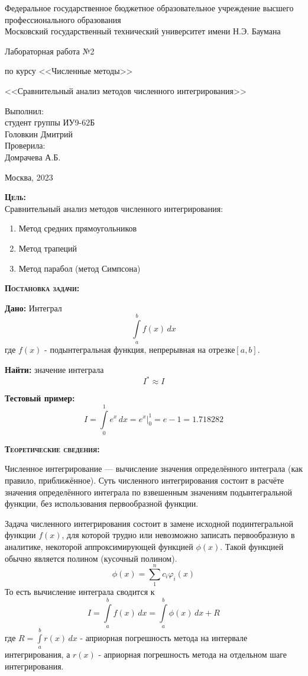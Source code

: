 \documentclass [12pt]{article}
\title{}
\date{}
\author{}
\begin{document}
\begin{titlepage}
\thispagestyle{empty}
\begin{center}
Федеральное государственное бюджетное образовательное учреждение высшего профессионального образования \\Московский государственный технический университет имени Н.Э. Баумана

\end{center}
\vfill
\centerline{\large{Лабораторная работа №2}}
\centerline{\large{по курсу <<Численные методы>>}}
\centerline{\large{<<Сравнительный анализ методов численного интегрирования>>}}
\vfill
\hfill\parbox{5cm} {
           Выполнил:\\
           студент группы ИУ9-62Б \hfill \\
           Головкин Дмитрий\hfill \medskip\\
           Проверила:\\
           Домрачева А.Б.\hfill
       }
\centerline{Москва, 2023}
\clearpage
\end{titlepage}
\textsc{\textbf{Цель:}} 
\\ Сравнительный анализ методов численного интегрирования:
\begin{enumerate}
\item Метод средних прямоугольников
\item Метод трапеций
\item Метод парабол (метод Симпсона)
\end{enumerate}

\textsc{\textbf{Постановка задачи:}}

\textbf{Дано:}  Интеграл $$\int\limits_a^b f(x)\,dx $$где $f(x)$ - подынтегральная функция, непрерывная на отрезке$[a,b]$.

\textbf{Найти:} значение интеграла $$I^{*} \approx  I $$

\textbf{Тестовый пример:} $$ I = \int\limits_0^1 e^x\,dx = e^x \bigg|_0^1 = e - 1 = 1.718282$$

\textsc{\textbf{Теоретические сведения:}}

Численное интегрирование — вычисление значения определённого интеграла (как правило, приближённое). Суть численного интегрирования состоит в расчёте значения определённого интеграла по взвешенным значениям подынтегральной функции, без использования первообразной функции.

Задача численного интегрирования состоит в замене исходной подинтегральной функции $f(x)$, для которой трудно или невозможно записать первообразную в аналитике, некоторой аппроксимирующей функцией $\phi(x)$. Такой функцией обычно является полином (кусочный полином).$$\phi(x)=\sum\limits_1^n c_{i}\varphi_{i}(x)$$То есть вычисление интеграла сводится к $$I=\int\limits_a^b f(x)\,dx = \int\limits_a^b \phi(x)\,dx + R$$ где $R=\int\limits_a^b r(x)\,dx $ - априорная погрешность метода на интервале интегрирования, а $r(x)$ - априорная погрешность метода на отдельном шаге интегрирования. 
\end{document}
